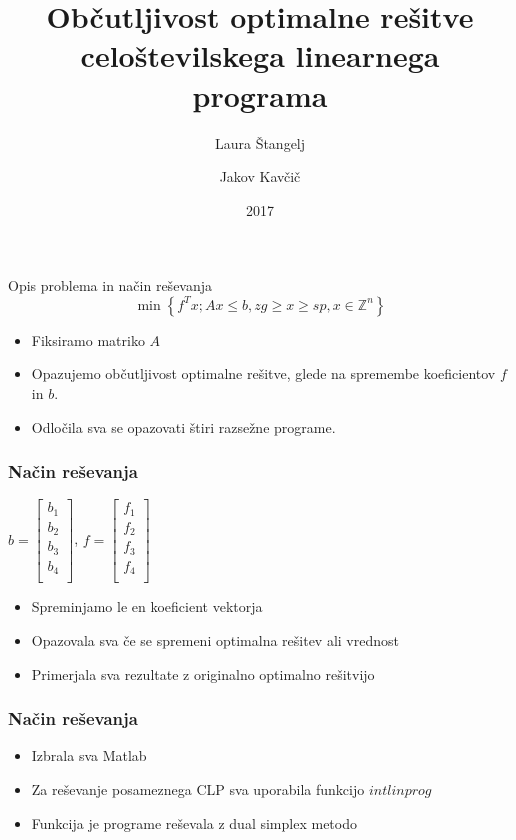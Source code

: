 \documentclass[t]{beamer}
\title{Občutljivost optimalne rešitve celoštevilskega linearnega programa}
\author
{Laura Štangelj \and Jakov Kavčič}
\date{2017}
\begin{document}
\begin{frame}
  \titlepage
\end{frame}

\begin{frame}{Opis problema in način reševanja}
$$\min\left\{f^Tx; Ax \leq b, zg \geq x \geq sp, x \in \mathbb{Z}^n \right\}$$
\begin{itemize}
\item Fiksiramo matriko $A$
\item Opazujemo občutljivost optimalne rešitve, glede na spremembe koeficientov $f$ in $b$.
\item Odločila sva se opazovati štiri razsežne programe.
\end{itemize}
\end{frame}

\begin{frame}
\frametitle{Način reševanja}
\begin{center}
$b = \begin{bmatrix}
b_1\\
b_2\\
b_3\\
b_4\\
\end{bmatrix}$, $f = \begin{bmatrix}
f_1\\
f_2\\
f_3\\
f_4\\
\end{bmatrix}$
\end{center}
\begin{itemize}
\item Spreminjamo le en koeficient vektorja
\item Opazovala sva če se spremeni optimalna rešitev ali vrednost
\item Primerjala sva rezultate z originalno optimalno rešitvijo
\end{itemize}
\end{frame}


\begin{frame}
\frametitle{Način reševanja}
\begin{itemize}
\item Izbrala sva Matlab
\item Za reševanje posameznega CLP sva uporabila funkcijo $intlinprog$
\item Funkcija je programe reševala z dual simplex metodo
\end{itemize}
\end{frame}
\end{document}
